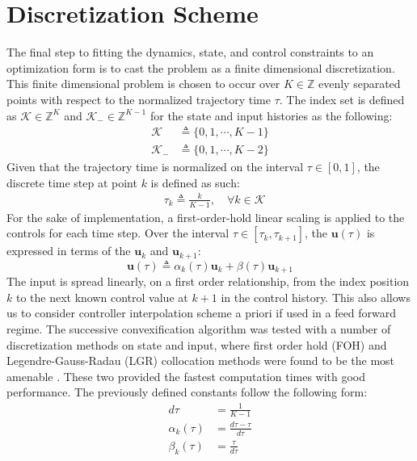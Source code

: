 \section{Discretization Scheme}
The final step to fitting the dynamics, state, and control constraints to an optimization form is to cast the problem as a finite dimensional discretization. This finite dimensional problem is chosen to occur over $K\in\mathbb{Z}$ evenly separated points with respect to the normalized trajectory time $\tau$. The index set is defined as $\mathcal{K}\in\mathbb{Z}^{K}$ and $\mathcal{K}_-\in\mathbb{Z}^{K-1}$ for the state and input histories as the following:
\begin{align*}
	\mathcal{K} &\triangleq \{0,1,\cdots, K-1\} \\
	\mathcal{K}_- &\triangleq \{0,1,\cdots, K-2 \}
\end{align*}
%
Given that the trajectory time is normalized on the interval $\tau \in [0,1 ]$, the discrete time step at point $k$ is defined as such:
%
\begin{align}
& \tau_k \triangleq \frac{k}{K-1}, \quad \forall k \in \mathcal{K}
\end{align}
%
For the sake of implementation, a first-order-hold linear scaling is applied to the controls for each time step. Over the interval $\tau \in [\tau_k, \tau_{k+1}]$, the $\mathbf{u}(\tau)$ is expressed in terms of the $\mathbf{u}_k$
 and $\mathbf{u}_{k+1}$:
\begin{equation}
	\mathbf{u}(\tau) \triangleq \alpha_k(\tau) \mathbf{u}_k + \beta(\tau) \mathbf{u}_{k+1}
\end{equation}
%
The input is spread linearly, on a first order relationship, from the index position $k$ to the next known control value at $k+1$ in the control history. This also allows us to consider controller interpolation scheme a priori if used in a feed forward regime. The successive convexification algorithm was tested with a number of discretization methods on state and input, where first order hold (FOH) and Legendre-Gauss-Radau (LGR) collocation methods were found to be the most amenable \cite{malyuta2019discrete}. These two provided the fastest computation times with good performance.
%
The previously defined constants follow the following form:
\begin{align}
d\tau &= \frac{1}{K-1} \\
\alpha_k(\tau) &= \frac{d\tau - \tau}{d\tau} \\
\beta_k(\tau) &= \frac{\tau}{d\tau}
\end{align}
%


